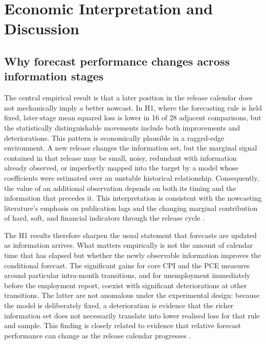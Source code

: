 \section{Economic Interpretation and Discussion}
\label{sec:discussion}

\subsection{Why forecast performance changes across information stages}
\label{subsec:why_stage_changes}

The central empirical result is that a later position in the release calendar
does not mechanically imply a better nowcast.  In H1, where the forecasting
rule is held fixed, later-stage mean squared loss is lower in 16 of 28 adjacent
comparisons, but the statistically distinguishable movements include both
improvements and deteriorations.  This pattern is economically plausible in a
ragged-edge environment.  A new release changes the information set, but the
marginal signal contained in that release may be small, noisy, redundant with
information already observed, or imperfectly mapped into the target by a model
whose coefficients were estimated over an unstable historical relationship.
Consequently, the value of an additional observation depends on both its
timing and the information that precedes it.  This interpretation is consistent
with the nowcasting literature's emphasis on publication lags and the changing
marginal contribution of hard, soft, and financial indicators through the
release cycle \citep{banbura2011blackbox,liebermann2014realtime}.

The H1 results therefore sharpen the usual statement that forecasts are
updated as information arrives.  What matters empirically is not the amount of
calendar time that has elapsed but whether the newly observable information
improves the conditional forecast.  The significant gains for core CPI and the
PCE measures around particular intra-month transitions, and for unemployment
immediately before the employment report, coexist with significant
deteriorations at other transitions.  The latter are not anomalous under the
experimental design: because the model is deliberately fixed, a deterioration
is evidence that the richer information set does not necessarily translate
into lower realised loss for that rule and sample.  This finding is closely
related to evidence that relative forecast performance can change as the
release calendar progresses \citep{aastveit2014density}.

